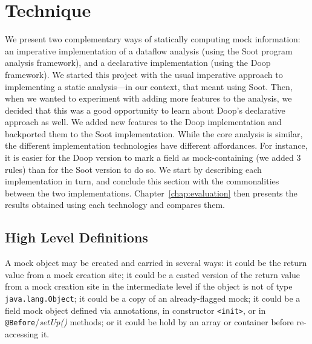 \chapter{Technique}
\label{chap:technique}	

We present two complementary ways of statically computing mock information: an imperative implementation of a dataflow analysis (using the Soot program analysis framework), and a declarative implementation (using the Doop framework). We started this project with the usual imperative approach to implementing a static analysis---in our context, that meant using Soot. Then, when we wanted to experiment with adding more features to the analysis, we decided that this was a good opportunity to learn about Doop's declarative approach as well. We added new features to the Doop implementation and backported them to the Soot implementation. While the core analysis is similar, the different implementation technologies have different affordances. For instance, it is easier for the Doop version to mark a field as mock-containing (we added 3 rules) than for the Soot version to do so. We start by describing each implementation in turn, and conclude this section with the commonalities between the two implementations. Chapter~\ref{chap:evaluation} then presents the results obtained using each technology and compares them. 


\section{High Level Definitions}
\label{sec:high-level}


A mock object may be created and carried in several ways: it could be the return value from a mock creation site; it could be a casted version of the return value from a mock creation site in the intermediate level if the object is not of type \texttt{java.lang.Object}; it could be a copy of an already-flagged mock; it could be a field mock object defined via annotations, in constructor \texttt{<init>}, or in \texttt{@Before}/\textit{setUp()} methods; or it could be hold by an array or container before re-accessing it.

